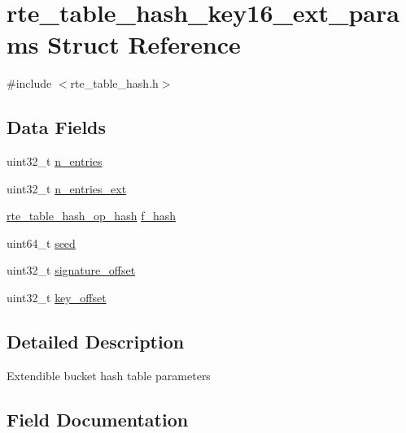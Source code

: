 \hypertarget{structrte__table__hash__key16__ext__params}{}\section{rte\+\_\+table\+\_\+hash\+\_\+key16\+\_\+ext\+\_\+params Struct Reference}
\label{structrte__table__hash__key16__ext__params}


{\ttfamily \#include $<$rte\+\_\+table\+\_\+hash.\+h$>$}

\subsection*{Data Fields}
\begin{DoxyCompactItemize}
\item 
uint32\+\_\+t \hyperlink{structrte__table__hash__key16__ext__params_aafba5a1f8ad65b41148894026098cad7}{n\+\_\+entries}
\item 
uint32\+\_\+t \hyperlink{structrte__table__hash__key16__ext__params_a27661399b844b87af80fbeb4052ae2cb}{n\+\_\+entries\+\_\+ext}
\item 
\hyperlink{rte__table__hash_8h_a6633f20f58e850abc3d1650af5d900da}{rte\+\_\+table\+\_\+hash\+\_\+op\+\_\+hash} \hyperlink{structrte__table__hash__key16__ext__params_a5a7373267cebe4384507b331c883624a}{f\+\_\+hash}
\item 
uint64\+\_\+t \hyperlink{structrte__table__hash__key16__ext__params_a13dfa5fcb8e1184f1f7756e717fd2807}{seed}
\item 
uint32\+\_\+t \hyperlink{structrte__table__hash__key16__ext__params_a255e199334632db5019afe0eb166a05a}{signature\+\_\+offset}
\item 
uint32\+\_\+t \hyperlink{structrte__table__hash__key16__ext__params_aa09132fc271bc1be2e4032587665bcf7}{key\+\_\+offset}
\end{DoxyCompactItemize}


\subsection{Detailed Description}
Extendible bucket hash table parameters 

\subsection{Field Documentation}
\hypertarget{structrte__table__hash__key16__ext__params_a5a7373267cebe4384507b331c883624a}{}
